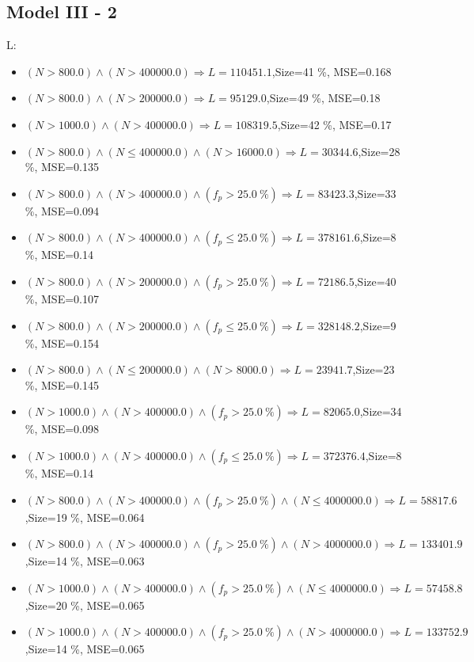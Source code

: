 \documentclass[numbered]{CSL}
\begin{document}
\subsection{Model III - 2}
L:
\begin{itemize}
\item $(N > 800.0) \land (N > 400000.0) \Rightarrow L = 110451.1$,\hfill Size=41 \%, MSE=0.168
\item $(N > 800.0) \land (N > 200000.0) \Rightarrow L = 95129.0$,\hfill Size=49 \%, MSE=0.18
\item $(N > 1000.0) \land (N > 400000.0) \Rightarrow L = 108319.5$,\hfill Size=42 \%, MSE=0.17
\item $(N > 800.0) \land (N \leq 400000.0) \land (N > 16000.0) \Rightarrow L = 30344.6$,\hfill Size=28 \%, MSE=0.135
\item $(N > 800.0) \land (N > 400000.0) \land (f_p > 25.0~\%) \Rightarrow L = 83423.3$,\hfill Size=33 \%, MSE=0.094
\item $(N > 800.0) \land (N > 400000.0) \land (f_p \leq 25.0~\%) \Rightarrow L = 378161.6$,\hfill Size=8 \%, MSE=0.14
\item $(N > 800.0) \land (N > 200000.0) \land (f_p > 25.0~\%) \Rightarrow L = 72186.5$,\hfill Size=40 \%, MSE=0.107
\item $(N > 800.0) \land (N > 200000.0) \land (f_p \leq 25.0~\%) \Rightarrow L = 328148.2$,\hfill Size=9 \%, MSE=0.154
\item $(N > 800.0) \land (N \leq 200000.0) \land (N > 8000.0) \Rightarrow L = 23941.7$,\hfill Size=23 \%, MSE=0.145
\item $(N > 1000.0) \land (N > 400000.0) \land (f_p > 25.0~\%) \Rightarrow L = 82065.0$,\hfill Size=34 \%, MSE=0.098
\item $(N > 1000.0) \land (N > 400000.0) \land (f_p \leq 25.0~\%) \Rightarrow L = 372376.4$,\hfill Size=8 \%, MSE=0.14
\item $(N > 800.0) \land (N > 400000.0) \land (f_p > 25.0~\%) \land (N \leq 4000000.0) \Rightarrow L = 58817.6$,\hfill Size=19 \%, MSE=0.064
\item $(N > 800.0) \land (N > 400000.0) \land (f_p > 25.0~\%) \land (N > 4000000.0) \Rightarrow L = 133401.9$,\hfill Size=14 \%, MSE=0.063
\item $(N > 1000.0) \land (N > 400000.0) \land (f_p > 25.0~\%) \land (N \leq 4000000.0) \Rightarrow L = 57458.8$,\hfill Size=20 \%, MSE=0.065
\item $(N > 1000.0) \land (N > 400000.0) \land (f_p > 25.0~\%) \land (N > 4000000.0) \Rightarrow L = 133752.9$,\hfill Size=14 \%, MSE=0.065

\end{itemize}
\end{document}
